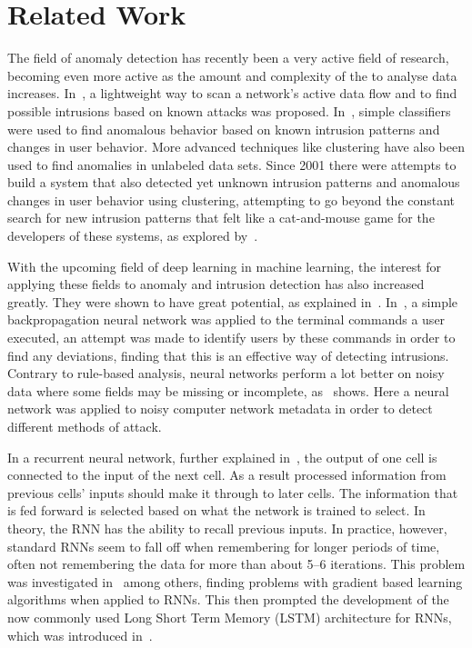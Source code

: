 \chapter{Related Work}\label{ch:related_work}

The field of anomaly detection has recently been a very active field of research, becoming even more active as the amount and complexity of the to analyse data increases. In~\cite{roesch1999snort}, a lightweight way to scan a network's active data flow and to find possible intrusions based on known attacks was proposed. In~\cite{lee1998data}, simple classifiers were used to find anomalous behavior based on known intrusion patterns and changes in user behavior. More advanced techniques like clustering have also been used to find anomalies in unlabeled data sets. Since 2001 there were attempts to build a system that also detected yet unknown intrusion patterns and anomalous changes in user behavior using clustering, attempting to go beyond the constant search for new intrusion patterns that felt like a cat-and-mouse game for the developers of these systems, as explored by~\cite{Portnoy01intrusiondetection}.

With the upcoming field of deep learning in machine learning, the interest for applying these fields to anomaly and intrusion detection has also increased greatly. They were shown to have great potential, as explained in~\cite{lecun2015deep}. In~\cite{ryan1998intrusion}, a simple backpropagation neural network was applied to the terminal commands a user executed, an attempt was made to identify users by these commands in order to find any deviations, finding that this is an effective way of detecting intrusions. Contrary to rule-based analysis, neural networks perform a lot better on noisy data where some fields may be missing or incomplete, as~\cite{cannady1998artificial} shows. Here a neural network was applied to noisy computer network metadata in order to detect different methods of attack.

In a recurrent neural network, further explained in~\cite{lecun2015deep}, the output of one cell is connected to the input of the next cell. As a result processed information from previous cells' inputs should make it through to later cells. The information that is fed forward is selected based on what the network is trained to select. In theory, the RNN has the ability to recall previous inputs. In practice, however, standard RNNs seem to fall off when remembering for longer periods of time, often not remembering the data for more than about 5--6 iterations. This problem was investigated in~\cite{bengio1994learning} among others, finding problems with gradient based learning algorithms when applied to RNNs. This then prompted the development of the now commonly used Long Short Term Memory (LSTM) architecture for RNNs, which was introduced in~\cite{hochreiter1997long}.

